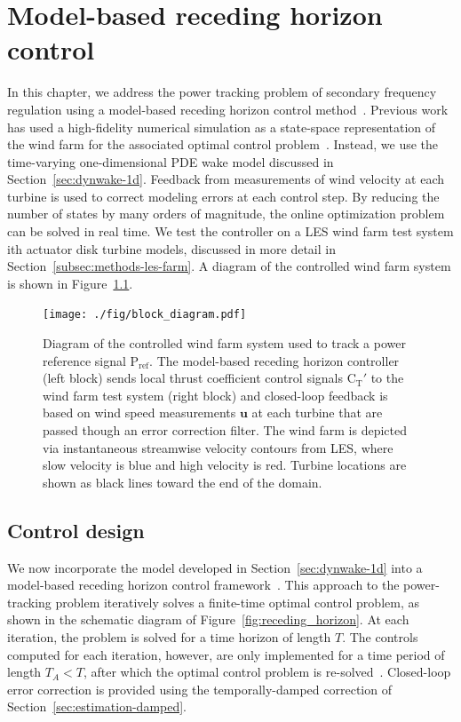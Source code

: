 \chapter{Model-based receding horizon control}
\label{chap:rhc}

In this chapter, we address the power tracking problem of secondary frequency regulation using a model-based receding horizon control method~\cite{Rawlings2009a}.  Previous work has used a high-fidelity numerical simulation as a state-space representation of the wind farm for the associated optimal control problem~\cite{Goit2015a}. Instead, we use the time-varying one-dimensional PDE wake model discussed in Section~\ref{sec:dynwake-1d}. Feedback from measurements of wind velocity at each turbine is used to correct modeling errors at each control step. By reducing the number of states by many orders of magnitude, the online optimization problem can be solved in real time. We test the controller on a LES wind farm test system ith actuator disk turbine models, discussed in more detail in Section~\ref{subsec:methods-les-farm}. A diagram of the controlled wind farm system is shown in Figure~\ref{fig:diagram}.

\begin{figure}[]
\centering
\texttt{[image: ./fig/block\_diagram.pdf]}
\caption{Diagram of the controlled wind farm system used to track a power reference signal $\text{P}_\text{ref}$. The model-based receding horizon controller (left block) sends local thrust coefficient control signals $\text{C}_\text{T}'$ to the wind farm test system (right block) and closed-loop feedback is based on wind speed measurements $\mathbf{u}$ at each turbine that are passed though an error correction filter. The wind farm is depicted via instantaneous streamwise velocity contours from LES, where slow velocity is blue and high velocity is red. Turbine locations are shown as black lines toward the end of the domain.}
\label{fig:diagram}
\end{figure}

\section{Control design}
\label{sec:rhc-control}

We now incorporate the model developed in Section~\ref{sec:dynwake-1d} into a model-based receding horizon control framework~\cite{Rawlings2009a}. This approach to the power-tracking problem iteratively solves a finite-time optimal control problem, as shown in the schematic diagram of Figure~\ref{fig:receding_horizon}. At each iteration, the problem is solved for a time horizon of length $T$. The controls computed for each iteration, however, are only implemented for a time period of length $T_A < T$, after which the optimal control problem is re-solved~\cite{Bewley2001a, Goit2015a}. Closed-loop error correction is provided using the temporally-damped correction of Section~\ref{sec:estimation-damped}.


